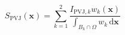 $$
S_{\mathrm{PVJ}}(\mathbf x) = \sum_{k=1}^{2} \frac{I_{\mathrm{PVJ},k} w_k(\mathbf x)}{\int_{B_k\cap\Omega} w_k\,\mathrm d\mathbf x}
$$
